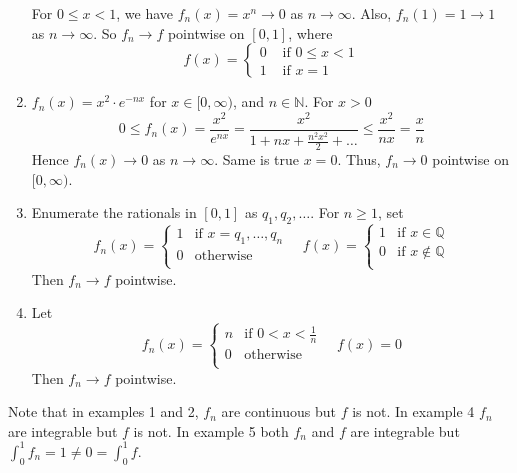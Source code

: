 \documentclass[a4paper,11pt]{article}
\begin{document}
\begin{example}
\begin{enumerate}
        For $0 \leqslant x<1$, we have $f_{n}(x)=x^{n} \rightarrow 0$ as $n \rightarrow \infty$.
        Also, $f_{n}(1)=1 \rightarrow 1$ as $n \rightarrow \infty$. So $f_{n} \rightarrow f$ pointwise on $[0,1]$, where
        \[
        f(x)= \begin{cases}0 & \text { if } 0 \leqslant x<1 \\ 1 & \text { if } x=1\end{cases}
        \]
        \item $f_{n}(x)=x^{2} \cdot e^{-n x}$ for $x \in[0, \infty)$, and $n \in \mathbb{N}$. For $x>0$
        \[
        0 \leqslant f_{n}(x)=\frac{x^{2}}{e^{n x}}=\frac{x^{2}}{1+n x+\frac{n^{2} x^{2}}{2}+\ldots} \leqslant \frac{x^{2}}{n x}=\frac{x}{n}
        \]
        Hence $f_{n}(x) \rightarrow 0$ as $n \rightarrow \infty$. Same is true $x=0$. Thus, $f_{n} \rightarrow 0$ pointwise on $[0, \infty)$.
        \item Enumerate the rationals in $[0,1]$ as $ q_1,q_2,\dots $. For $n\ge 1$, set 
        \[
            f_n(x) = \begin{cases}
            1 &\text{if }x=q_1,\dots,q_n\\
            0 &\text{otherwise}\\
            \end{cases} \quad f(x) = \begin{cases}
            1 &\text{if }x\in \mathbb{Q}\\
            0 &\text{if }x \not\in  \mathbb{Q}\\
            \end{cases} 
        \]
        Then $f_n\to f$ pointwise. 
        \item Let 
        \[
            f_n(x) = \begin{cases}
            n &\text{if } 0<x<\frac{1}{n}\\
            0 &\text{otherwise}\\
            \end{cases} \quad f(x)=0
        \]
        Then $ f_n\to f $ pointwise. 
    \end{enumerate}
    Note that in examples 1 and 2, $f_n$ are continuous but $f$ is not. In example 4 $f_n$ are integrable but $f$ is not. In example 5 both $f_n$ and $f$ are integrable but $ \int_0^1 f_n=1\neq 0 = \int_0^1 f $. 
\end{example}
\end{document}
